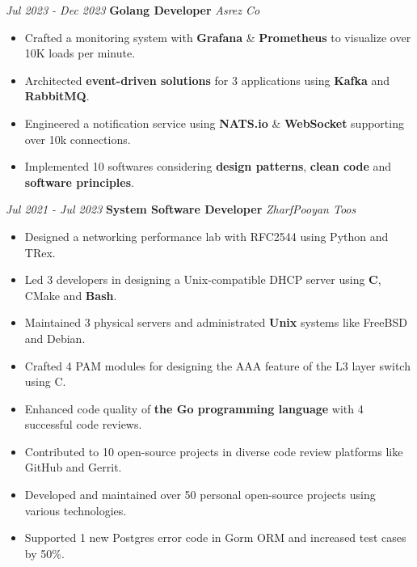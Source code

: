 \documentclass{engineercv}
\begin{document}
\begin{twocolentry}{\textit{Jul 2023 - Dec 2023}}
  \textbf{Golang Developer}
  \textit{Asrez Co}
\end{twocolentry}

\begin{itemize}
  \item Crafted a monitoring system with \textbf{Grafana} \& \textbf{Prometheus} to visualize over 10K loads per minute.
  \item Architected \textbf{event-driven solutions} for 3 applications using \textbf{Kafka} and \textbf{RabbitMQ}.
  \item Engineered a notification service using \textbf{NATS.io} \& \textbf{WebSocket} supporting over 10k connections.
  \item Implemented 10 softwares considering \textbf{design patterns}, \textbf{clean code} and \textbf{software principles}.
\end{itemize}

\begin{twocolentry}{\textit{Jul 2021 - Jul 2023}}
  \textbf{System Software Developer}
  \textit{ZharfPooyan Toos}
\end{twocolentry}

\begin{itemize}
  \item Designed a networking performance lab with RFC2544 using Python and TRex.
  \item Led 3 developers in designing a Unix-compatible DHCP server using \textbf{C}, CMake and \textbf{Bash}.
  \item Maintained 3 physical servers and administrated \textbf{Unix} systems like FreeBSD and Debian.
  \item Crafted 4 PAM modules for designing the AAA feature of the L3 layer switch using C.
\end{itemize}

\begin{itemize}
  \item Enhanced code quality of \textbf{the Go programming language} with 4 successful code reviews.
  \item Contributed to 10 open-source projects in diverse code review platforms like GitHub and Gerrit.
  \item Developed and maintained over 50 personal open-source projects using various technologies.
  \item Supported 1 new Postgres error code in Gorm ORM and increased test cases by 50\%.
\end{itemize}
\end{document}
